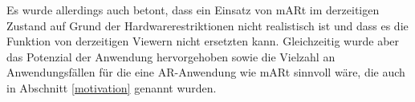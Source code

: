 Es wurde allerdings auch betont, dass ein Einsatz von mARt im derzeitigen Zustand auf Grund der Hardwarerestriktionen nicht realistisch ist und dass es die Funktion von derzeitigen Viewern nicht ersetzten kann. Gleichzeitig wurde aber das Potenzial der Anwendung hervorgehoben sowie die Vielzahl an Anwendungsfällen für die eine AR-Anwendung wie mARt sinnvoll wäre, die auch in Abschnitt \ref{motivation} genannt wurden. 

